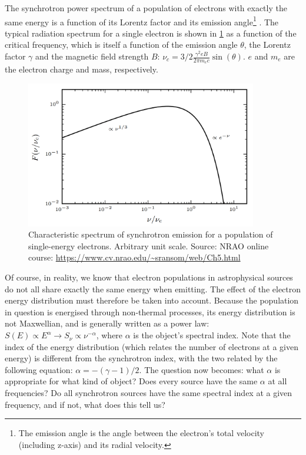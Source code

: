 \pg
The synchrotron power spectrum of a population of electrons with exactly the same energy is a function of its Lorentz factor and its emission angle\footnote{The emission angle is the angle between the electron's total velocity (including z-axis) and its radial velocity.} . The typical radiation spectrum for a single electron is shown in \cref{fig.synchrotron.1electrion} as a function of the critical frequency, which is itself a function of the emission angle $\theta$, the Lorentz factor $\gamma$ and the magnetic field strength $B$: $\nu_c=3/2\frac{\gamma^2 e B}{2\pi m_e c}\sin(\theta)$. $e$ and $m_e$ are the electron charge and mass, respectively.
\begin{figure}[!h]
\centering
\includegraphics[width=0.9\textwidth]{images/Synchrotron-single-electron.png}
\caption{\label{fig.synchrotron.1electrion} Characteristic spectrum of synchrotron emission for a population of single-energy electrons. Arbitrary unit scale. Source: NRAO online course: \url{https://www.cv.nrao.edu/~sransom/web/Ch5.html}}
\end{figure}

\pg
Of course, in reality, we know that electron populations in astrophysical sources do not all share exactly the same energy when emitting. The effect of the electron energy distribution must therefore be taken into account. Because the population in question is energised through non-thermal processes, its energy distribution is not Maxwellian, and is generally written as a power law: $S(E) \propto E^\alpha \rightarrow S_\nu \propto \nu^{-\alpha}$, where $\alpha$ is the object's spectral index. Note that the index of the energy distribution (which relates the number of electrons at a given energy) is different from the synchrotron index, with the two related by the following equation: $\alpha=-(\gamma-1)/2$.
The question now becomes: what $\alpha$ is appropriate for what kind of object? Does every source have the same $\alpha$ at all frequencies? Do all synchrotron sources have the same spectral index at a given frequency, and if not, what does this tell us?

